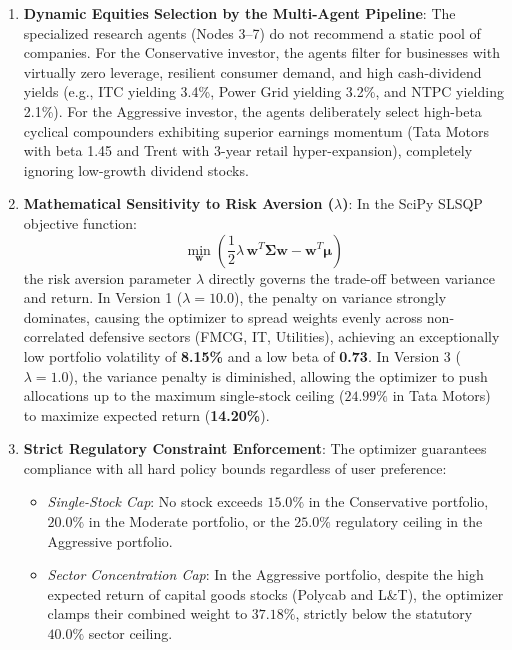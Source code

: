 \begin{enumerate}
    \item \textbf{Dynamic Equities Selection by the Multi-Agent Pipeline}:
    The specialized research agents (Nodes 3--7) do not recommend a static pool of companies. For the Conservative investor, the agents filter for businesses with virtually zero leverage, resilient consumer demand, and high cash-dividend yields (e.g., ITC yielding 3.4\%, Power Grid yielding 3.2\%, and NTPC yielding 2.1\%). For the Aggressive investor, the agents deliberately select high-beta cyclical compounders exhibiting superior earnings momentum (Tata Motors with beta 1.45 and Trent with 3-year retail hyper-expansion), completely ignoring low-growth dividend stocks.
    
    \item \textbf{Mathematical Sensitivity to Risk Aversion ($\lambda$)}:
    In the SciPy SLSQP objective function:
    \[
    \min_{\mathbf{w}} \left( \frac{1}{2} \lambda \, \mathbf{w}^T \mathbf{\Sigma} \mathbf{w} - \mathbf{w}^T \boldsymbol{\mu} \right)
    \]
    the risk aversion parameter $\lambda$ directly governs the trade-off between variance and return. In Version 1 ($\lambda = 10.0$), the penalty on variance strongly dominates, causing the optimizer to spread weights evenly across non-correlated defensive sectors (FMCG, IT, Utilities), achieving an exceptionally low portfolio volatility of \textbf{8.15\%} and a low beta of \textbf{0.73}. In Version 3 ($\lambda = 1.0$), the variance penalty is diminished, allowing the optimizer to push allocations up to the maximum single-stock ceiling ($24.99\%$ in Tata Motors) to maximize expected return (\textbf{14.20\%}).

    \item \textbf{Strict Regulatory Constraint Enforcement}:
    The optimizer guarantees compliance with all hard policy bounds regardless of user preference:
    \begin{itemize}
        \item \textit{Single-Stock Cap}: No stock exceeds $15.0\%$ in the Conservative portfolio, $20.0\%$ in the Moderate portfolio, or the $25.0\%$ regulatory ceiling in the Aggressive portfolio.
        \item \textit{Sector Concentration Cap}: In the Aggressive portfolio, despite the high expected return of capital goods stocks (Polycab and L\&T), the optimizer clamps their combined weight to $37.18\%$, strictly below the statutory $40.0\%$ sector ceiling.
    \end{itemize}


\end{enumerate}
